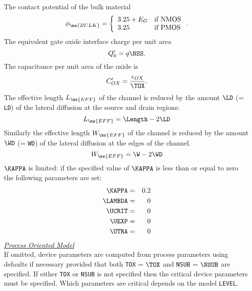 \noindent The contact potential of the bulk material
\begin{equation}
\phi_{\ms{BULK}} = \left\{ \begin{array}{ll}
                          3.25 + E_G & \mbox{if NMOS}\\
                          3.25       & \mbox{if PMOS}
                          \end{array} \right. .
\end{equation}
The equivalent gate oxide interface charge per unit area
\begin{equation}
Q'_0 = q\NSS .
\end{equation}
The capacitance per unit area of the oxide is
\begin{equation}
C'_{OX} = {{\epsilon_{OX}} \over { \TOX}} .
\end{equation}
The effective length $L_{\ms{EFF}}$ of the channel is reduced by
the amount $\LD$ (= {\tt LD}) of the lateral diffusion at the
source and drain regions:
\begin{equation}
L_{\ms{EFF}} = \Length - 2\LD
\end{equation}
Similarly the effective length $W_{\ms{EFF}}$ of the channel is
reduced by the amount $\WD$ (= {\tt WD}) of the lateral diffusion
at the edges of the channel.
\begin{equation}
W_{\ms{EFF}} = \W - 2\WD
\end{equation}
$\KAPPA$ is limited: if the specified value of $\KAPPA$ is less
than or equal to zero the following parameters are set:
\begin{eqnarray}
\KAPPA &=& 0.2\\
\LAMBDA &=& 0\\
\UCRIT &=& 0\\
\UEXP &=& 0\\
\UTRA &=& 0
\end{eqnarray}
\vfill \noindent\underline{\sl \large Process Oriented Model}
\\[0.1in]
If omitted, device parameters are computed from process parameters
using defaults if necessary provided that both {\tt TOX} = $\TOX$
and {\tt NSUB} = $\NSUB$ are specified.  If either {\tt TOX} or
{\tt NSUB} is not specified then the critical device parameters
must be specified.  Which parameters are critical depends on the
model {\tt LEVEL}.

